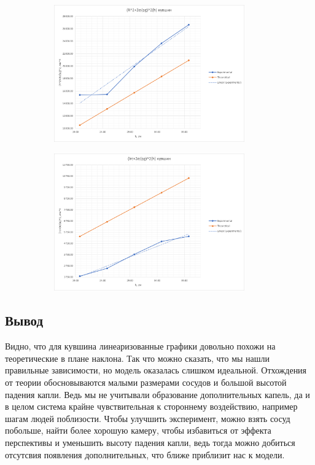 \documentclass[a4paper, 12pt]{article}
\begin{document}
\begin{figure}[H]
    \begin{subfigure}{0.5\textwidth}
        \includegraphics[width=0.9\textwidth]{img/linear R кувшин.png}
    \end{subfigure}%
    \begin{subfigure}{0.5\textwidth}
        \includegraphics[width=0.9\textwidth]{img/linear lrc кувшин.png}
    \end{subfigure}
\end{figure}

\subsection*{Вывод}
Видно, что для кувшина линеаризованные графики довольно похожи на
теоретические в плане наклона. Так что можно сказать, что мы нашли
правильные зависимости, но модель оказалась слишком идеальной.
Отхождения от теории обосновываются малыми размерами сосудов и большой
высотой падения капли. Ведь мы не учитывали образование дополнительных
капель, да и в целом система крайне чувствительная к стороннему
воздействию, например шагам людей поблизости. Чтобы улучшить эксперимент,
можно взять сосуд побольше, найти более хорошую камеру, чтобы избавиться
от эффекта перспективы и уменьшить высоту падения капли, ведь тогда
можно добиться отсутсвия появления дополнительных, что ближе приблизит
нас к модели.
\end{document}
